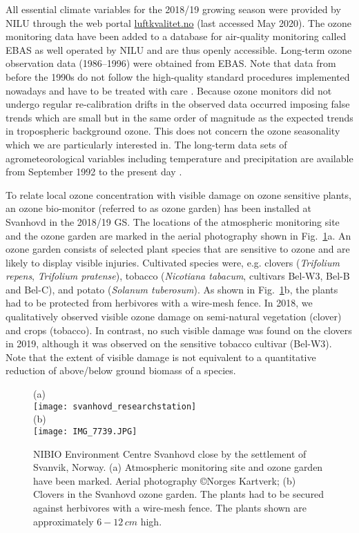 \documentclass[bg, manuscript]{copernicus}
\begin{document}
All essential climate variables for the 2018/19 growing season were provided by NILU through the web portal \href{luftkvalitet.no}{luftkvalitet.no} (last accessed May 2020). The ozone monitoring data have been added to a database for air-quality monitoring called EBAS as well operated by NILU and are thus openly accessible. Long-term ozone observation data (1986--1996) were obtained from EBAS. Note that data from before the 1990s do not follow the high-quality standard procedures implemented nowadays and have to be treated with care \citep{NILU2003}. Because ozone monitors did not undergo regular re-calibration drifts in the observed data occurred imposing false trends which are small but in the same order of magnitude as the expected trends in tropospheric background ozone. This does not concern the ozone seasonality which we are particularly interested in.
The long-term data sets of agrometeorological variables including temperature and precipitation are available from September 1992 to the present day \citep[LandbruksMeteorologiske Tjeneste][note the station name here is Pasvik]{LMT_NIBIO}.

To relate local ozone concentration \chem{[O_3]} with visible damage on ozone sensitive plants, an ozone bio-monitor (referred to as ozone garden) has been installed at Svanhovd in the 2018/19 GS. The locations of the atmospheric monitoring site and the ozone garden are marked in the aerial photography shown in Fig.~\ref{fig:svanhovd_research_station}a. An ozone garden consists of selected plant species that are sensitive to ozone and are likely to display visible injuries. Cultivated species were, e.g. clovers (\emph{Trifolium repens}, \emph{Trifolium pratense}), tobacco (\emph{Nicotiana tabacum}, cultivars Bel-W3, Bel-B and Bel-C), and potato (\emph{Solanum tuberosum}). As shown in Fig.~\ref{fig:svanhovd_research_station}b, the plants had to be protected from herbivores with a wire-mesh fence. In 2018, we qualitatively observed visible ozone damage on semi-natural vegetation (clover) and crops (tobacco). In contrast, no such visible damage was found on the clovers in 2019, although it was observed on the sensitive tobacco cultivar (Bel-W3). Note that the extent of visible damage is not equivalent to a quantitative reduction of above/below ground biomass of a species.

\begin{figure}[t]
  \centering
  (a)\\
  \texttt{[image: svanhovd\_researchstation]}\\
  (b)\\
  \texttt{[image: IMG\_7739.JPG]}
  \caption{NIBIO Environment Centre Svanhovd close by the settlement of Svanvik, Norway. (a) Atmospheric monitoring site and ozone garden have been marked. Aerial photography \copyright Norges Kartverk; (b) Clovers in the Svanhovd ozone garden. The plants had to be secured against herbivores with a wire-mesh fence. The plants shown are approximately $6-12\,\unit{cm}$ high.}
  \label{fig:svanhovd_research_station}
\end{figure}
\end{document}
